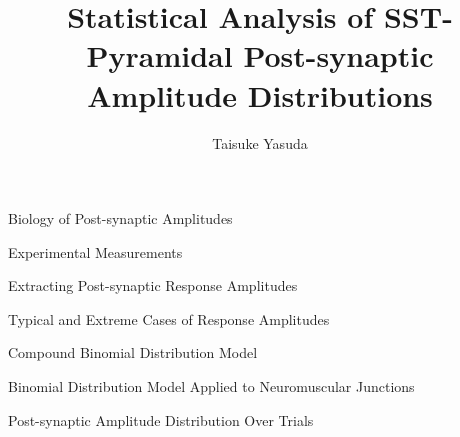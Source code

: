 \documentclass{beamer}
\title{Statistical Analysis of SST-Pyramidal Post-synaptic Amplitude Distributions}
\author{Taisuke Yasuda}
\begin{document}
\begin{frame}
  \titlepage
\end{frame}

\begin{frame}
  \tableofcontents
\end{frame}


\begin{frame}{Biology of Post-synaptic Amplitudes}
\end{frame}

\begin{frame}{Experimental Measurements}
\end{frame}

\begin{frame}{Extracting Post-synaptic Response Amplitudes}
\end{frame}

\begin{frame}{Typical and Extreme Cases of Response Amplitudes}
\end{frame}


\begin{frame}{Compound Binomial Distribution Model}
\end{frame}

\begin{frame}{Binomial Distribution Model Applied to Neuromuscular Junctions}
\end{frame}

\begin{frame}{Post-synaptic Amplitude Distribution Over Trials}
\end{frame}
\end{document}
